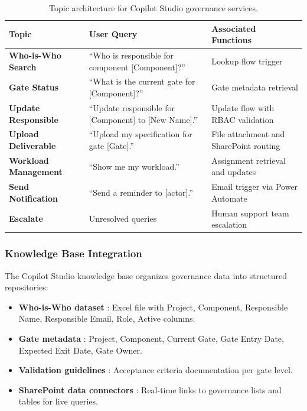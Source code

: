 \begin{table}[H]
\centering
\small
\caption{Topic architecture for Copilot Studio governance services.}
\label{tab:copilot-topic-architecture}
\begin{tabularx}{0.95\textwidth}{|l|X|X|}
    \hline
    \rowcolor[HTML]{E6F2FF}\textcolor[HTML]{003D99}{\textbf{Topic}} & \textcolor[HTML]{003D99}{\textbf{User Query}} & \textcolor[HTML]{003D99}{\textbf{Associated Functions}} \\
    \hline
    \textbf{Who-is-Who Search} & ``Who is responsible for component [Component]?'' & Lookup flow trigger \\
    \hline
    \textbf{Gate Status} & ``What is the current gate for [Component]?'' & Gate metadata retrieval \\
    \hline
    \textbf{Update Responsible} & ``Update responsible for [Component] to [New Name].'' & Update flow with RBAC validation \\
    \hline
    \textbf{Upload Deliverable} & ``Upload my specification for gate [Gate].'' & File attachment and SharePoint routing \\
    \hline
    \textbf{Workload Management} & ``Show me my workload.'' & Assignment retrieval and updates \\
    \hline
    \textbf{Send Notification} & ``Send a reminder to [actor].'' & Email trigger via Power Automate \\
    \hline
    \textbf{Escalate} & Unresolved queries & Human support team escalation \\
    \hline
\end{tabularx}
\end{table}

\subsubsection{\textcolor[HTML]{0066CC}{Knowledge Base Integration}}

The Copilot Studio knowledge base organizes governance data into structured repositories:

\begin{itemize}
    \item[\quad\textbullet] \textcolor[HTML]{003D99}{\textbf{Who-is-Who dataset}} : Excel file with Project, Component, Responsible Name, Responsible Email, Role, Active columns.
    \item[\quad\textbullet] \textcolor[HTML]{003D99}{\textbf{Gate metadata}} : Project, Component, Current Gate, Gate Entry Date, Expected Exit Date, Gate Owner.
    \item[\quad\textbullet] \textcolor[HTML]{003D99}{\textbf{Validation guidelines}} : Acceptance criteria documentation per gate level.
    \item[\quad\textbullet] \textcolor[HTML]{003D99}{\textbf{SharePoint data connectors}} : Real-time links to governance lists and tables for live queries.
\end{itemize}

